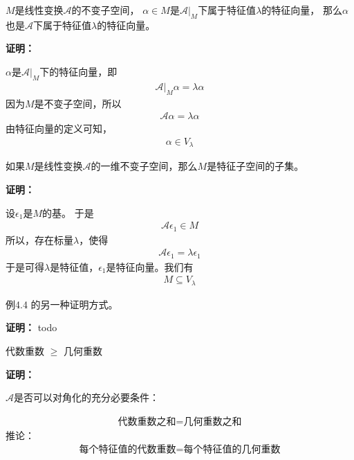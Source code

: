 \documentclass{article}
\begin{document}
\begin{zremark}
  $M$是线性变换$\mathscr{A}$的不变子空间，
  $\alpha \in M$是$\mathscr{A}|_M$下属于特征值$\lambda$的特征向量，
  那么$\alpha$也是$\mathscr{A}$下属于特征值$\lambda$的特征向量。
\end{zremark}

\textbf{证明：}

$\alpha$是$\mathscr{A}|_M$下的特征向量，即
\begin{align*}
  \mathscr{A}|_M \alpha = \lambda \alpha
\end{align*}
因为$M$是不变子空间，所以
\begin{align*}
  \mathscr{A} \alpha = \lambda \alpha 
\end{align*}
由特征向量的定义可知，
\begin{align*}
  \alpha \in V_{\lambda}
\end{align*}

\begin{zremark}
  如果$M$是线性变换$\mathscr{A}$的一维不变子空间，那么$M$是特征子空间的子集。
\end{zremark}

\textbf{证明：}

设$\epsilon_1$是$M$的基。
于是
\begin{align*}
  \mathscr{A} \epsilon_1 \in M
\end{align*}
所以，存在标量$\lambda$，使得
\begin{align*}
  \mathscr{A} \epsilon_1 = \lambda \epsilon_1
\end{align*}
于是可得$\lambda$是特征值，$\epsilon_1$是特征向量。我们有
\begin{align*}
  M \subseteq V_\lambda
\end{align*}

\begin{zremark}
  例4.4 的另一种证明方式。
\end{zremark}

\textbf{证明：}
todo

\begin{zremark}
  代数重数 $\geq$ 几何重数
\end{zremark}

\textbf{证明：}

\begin{zremark}
  $\mathscr{A}$是否可以对角化的充分必要条件：

  \begin{align*}
    \textbf{代数重数之和} = \textbf{几何重数之和}
  \end{align*}
  推论：
  \begin{align*}
    \textbf{每个特征值的代数重数} = \textbf{每个特征值的几何重数}
  \end{align*}

\end{zremark}
\end{document}
